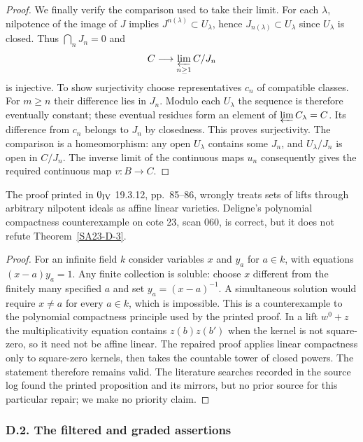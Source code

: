 \begin{proof}
We finally verify the comparison used to take their limit.  For
each $\lambda$, nilpotence of the image of $J$ implies
$J^{n(\lambda)}\subset U_\lambda$, hence
$J_{n(\lambda)}\subset U_\lambda$ since $U_\lambda$ is closed.
Thus $\bigcap_nJ_n=0$ and
\[
 C\longrightarrow\varprojlim_{n\geq1}C/J_n
\]
is injective.  To show surjectivity choose representatives $c_n$
of compatible classes.  For $m\geq n$ their difference lies in
$J_n$.  Modulo each $U_\lambda$ the sequence is therefore
eventually constant; these eventual residues form an element of
$\varprojlim C_\lambda=C$.  Its difference from $c_n$ belongs
to $J_n$ by closedness.  This proves surjectivity.  The comparison
is a homeomorphism: any open $U_\lambda$ contains some $J_n$,
and $U_\lambda/J_n$ is open in $C/J_n$.  The inverse limit of
the continuous maps $u_n$ consequently gives the required
continuous map $v:B\to C$.
\end{proof}

\begin{proposition}\label{SA23-D-4}
The proof printed in $0_{\rm IV}$ 19.3.12, pp.~85--86, wrongly
treats sets of lifts through arbitrary nilpotent ideals as affine
linear varieties.  Deligne's polynomial compactness counterexample
on cote 23, scan 060, is correct, but it does not refute
Theorem~\ref{SA23-D-3}.
\end{proposition}
\begin{proof}
For an infinite field $k$ consider variables $x$ and $y_a$ for
$a\in k$, with equations $(x-a)y_a=1$.  Any finite collection is
soluble: choose $x$ different from the finitely many specified
$a$ and set $y_a=(x-a)^{-1}$.  A simultaneous solution would
require $x\ne a$ for every $a\in k$, which is impossible.
This is a counterexample to the polynomial compactness principle
used by the printed proof.  In a lift $w^0+z$ the multiplicativity
equation contains $z(b)z(b')$ when the kernel is not square-zero,
so it need not be affine linear.  The repaired proof applies linear
compactness only to square-zero kernels, then takes the countable
tower of closed powers.  The statement therefore remains valid.
The literature searches recorded in the source log found the printed
proposition and its mirrors, but no prior source for this particular
repair; we make no priority claim.
\end{proof}

\subsubsection{D.2. The filtered and graded assertions}

